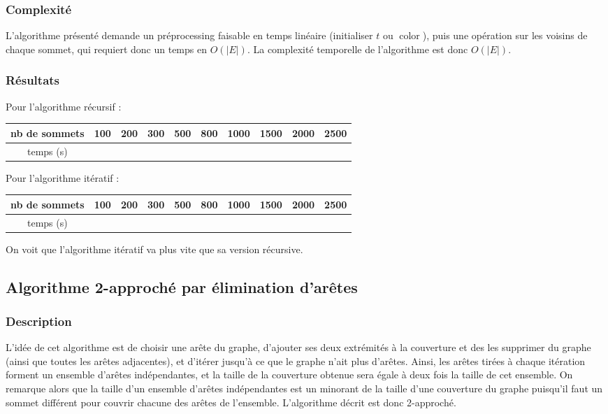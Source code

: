 \documentclass[a4paper,10pt]{article}
\DeclareMathOperator{\Color}{color}
\begin{document}
\subsubsection{Complexité}

L'algorithme présenté demande un préprocessing faisable en temps linéaire (initialiser $t$ ou $\Color$), puis une opération sur les voisins de chaque sommet, qui requiert donc un temps en $O(|E|)$. La complexité temporelle de l'algorithme est donc $O(|E|)$.

\subsubsection{Résultats}

Pour l'algorithme récursif :

\bigskip
\begin{tabular}{|c|c|c|c|c|c|c|c|c|c|}
	\hline 
	nb de sommets & 100 & 200 & 300 & 500 & 800 & 1000 & 1500 & 2000 & 2500 \\
	\hline
	temps (s) &  &  &  &  &  &  &  &  & \\
	\hline
\end{tabular}

\bigskip 
Pour l'algorithme itératif :

\bigskip
\begin{tabular}{|c|c|c|c|c|c|c|c|c|c|}
	\hline 
	nb de sommets & 100 & 200 & 300 & 500 & 800 & 1000 & 1500 & 2000 & 2500 \\
	\hline
	temps (s) &  &  &  &  &  &  &  &  & \\
	\hline
\end{tabular}

On voit que l'algorithme itératif va plus vite que sa version récursive.

\subsection{Algorithme 2-approché par élimination d'arêtes}

\subsubsection{Description}

L'idée de cet algorithme est de choisir une arête du graphe, d'ajouter ses deux extrémités à la couverture et des les supprimer du graphe (ainsi que toutes les arêtes adjacentes), et d'itérer jusqu'à ce que le graphe n'ait plus d'arêtes. Ainsi, les arêtes tirées à chaque itération forment un ensemble d'arêtes indépendantes, et la taille de la couverture obtenue sera égale à deux fois la taille de cet ensemble. On remarque alors que la taille d'un ensemble d'arêtes indépendantes est un minorant de la taille d'une couverture du graphe puisqu'il faut un sommet différent pour couvrir chacune des arêtes de l'ensemble. L'algorithme décrit est donc 2-approché.
\end{document}
